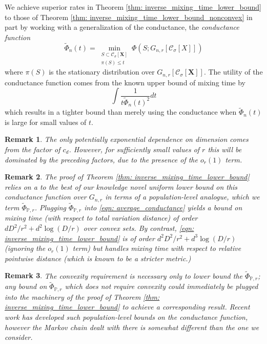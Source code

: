 \documentclass{article}
\newcommand{\1}{\mathbf{1}}
\newcommand{\Xbf}{\mathbf{X}}
\newcommand{\Pbb}{\mathbb{P}}
\newcommand{\Cset}{\mathcal{C}}
\newcommand{\Csig}{\Cset_{\sigma}}
\theoremstyle{aldenthm}
\theoremstyle{aldenrmrk}
\newtheorem{remark}{Remark}
\begin{document}
We achieve superior rates in Theorem \ref{thm: inverse_mixing_time_lower_bound} to those of Theorem \ref{thm: inverse_mixing_time_lower_bound_nonconvex} in part by working with a generalization of the conductance, the \emph{conductance function}
\begin{equation*}
\widetilde{\Phi}_n(t) = \min_{\substack{S \subset \Csig[\Xbf] \\ \pi(S) \leq t}} \Phi(S; G_{n,r}[\Csig[X]])
\end{equation*}
where $\pi(S)$ is the stationary distribution over $G_{n,r}[\Csig[\Xbf]]$. 
The utility of the conductance function comes from the known upper bound of mixing time by 
\begin{equation}
\label{eqn: average_conductance}
\int \frac{1}{t \widetilde{\Phi}_n(t)^2} dt
\end{equation}
 which results in a tighter bound than merely using the conductance when $\widetilde{\Phi}_n(t)$ is large for small values of $t$.
 
\begin{remark}
	The only potentially exponential dependence on dimension comes from the factor of $c_d$. However, for sufficiently small values of $r$ this will be dominated by the preceding factors, due to the presence of the $o_r(1)$ term.
\end{remark}
 
\begin{remark}
 The proof of Theorem \ref{thm: inverse_mixing_time_lower_bound} relies on a to the best of our knowledge novel uniform lower bound on this conductance function over $G_{n,r}$ in terms of a population-level analogue, which we term $\widetilde{\Phi}_{\Pbb,r}$. Plugging $\widetilde{\Phi}_{\Pbb,r}$ into \eqref{eqn: average_conductance} yields a bound on mixing time (with respect to total variation distance) of order $d D^2/r^2 + d^2\log(D/r)$ over convex sets. By contrast, \eqref{eqn: inverse_mixing_time_lower_bound} is of order $d^2 D^2/r^2 + d^3\log(D/r)$ (ignoring the $o_r(1)$ term) but handles mixing time with respect to relative pointwise distance (which is known to be a stricter metric.)
\end{remark}

\begin{remark}
	The convexity requirement is necessary only to lower bound the $\widetilde{\Phi}_{\Pbb,r}$; any bound on $\widetilde{\Phi}_{\Pbb,r}$ which does not require convexity could immediately be plugged into the machinery of the proof of Theorem \ref{thm: inverse_mixing_time_lower_bound} to achieve a corresponding result. Recent work \cite{abbasi17} has developed such population-level bounds on the conductance function, however the Markov chain dealt with there is somewhat different than the one we consider. 
\end{remark}
\end{document}
